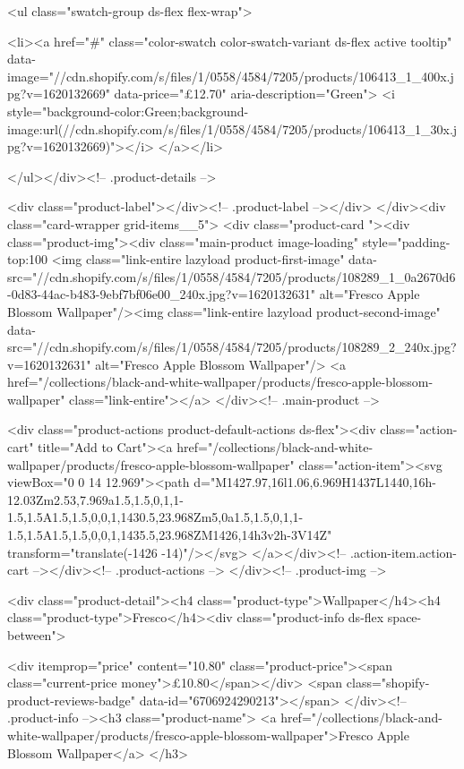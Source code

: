 {{{{{{{<ul class="swatch-group ds-flex flex-wrap">
        
<li><a href="#" class="color-swatch color-swatch-variant ds-flex active tooltip" data-image="//cdn.shopify.com/s/files/1/0558/4584/7205/products/106413_1_400x.jpg?v=1620132669" data-price="£12.70" aria-description="Green">
              <i style="background-color:Green;background-image:url(//cdn.shopify.com/s/files/1/0558/4584/7205/products/106413_1_30x.jpg?v=1620132669)"></i>
            </a></li>

      </ul></div><!-- .product-details -->

<div class="product-label"></div><!-- .product-label --></div>
          </div><div class="card-wrapper grid-items__5">
            <div class="product-card "><div class="product-img"><div class="main-product image-loading" style="padding-top:100%
      <img class="link-entire lazyload product-first-image" data-src="//cdn.shopify.com/s/files/1/0558/4584/7205/products/108289_1_0a2670d6-0d83-44ac-b483-9ebf7bf06e00_240x.jpg?v=1620132631" alt="Fresco Apple Blossom Wallpaper"/><img class="link-entire lazyload product-second-image" data-src="//cdn.shopify.com/s/files/1/0558/4584/7205/products/108289_2_240x.jpg?v=1620132631" alt="Fresco Apple Blossom Wallpaper"/>
      <a href="/collections/black-and-white-wallpaper/products/fresco-apple-blossom-wallpaper" class="link-entire"></a>
    </div><!-- .main-product -->
  
<div class="product-actions product-default-actions ds-flex"><div class="action-cart" title="Add to Cart"><a href="/collections/black-and-white-wallpaper/products/fresco-apple-blossom-wallpaper" class="action-item"><svg viewBox="0 0 14 12.969"><path d="M1427.97,16l1.06,6.969H1437L1440,16h-12.03Zm2.53,7.969a1.5,1.5,0,1,1-1.5,1.5A1.5,1.5,0,0,1,1430.5,23.968Zm5,0a1.5,1.5,0,1,1-1.5,1.5A1.5,1.5,0,0,1,1435.5,23.968ZM1426,14h3v2h-3V14Z" transform="translate(-1426 -14)"/></svg>
</a></div><!-- .action-item.action-cart --></div><!-- .product-actions -->
</div><!-- .product-img -->

<div class="product-detail"><h4 class="product-type">Wallpaper</h4><h4 class="product-type">Fresco</h4><div class="product-info ds-flex space-between">
    
<div itemprop="price" content="10.80" class="product-price"><span class="current-price money">£10.80</span></div>
    <span class="shopify-product-reviews-badge" data-id="6706924290213"></span>
  </div><!-- .product-info --><h3 class="product-name">
      <a href="/collections/black-and-white-wallpaper/products/fresco-apple-blossom-wallpaper">Fresco Apple Blossom Wallpaper</a>
    </h3>
    
}}}}}}}
